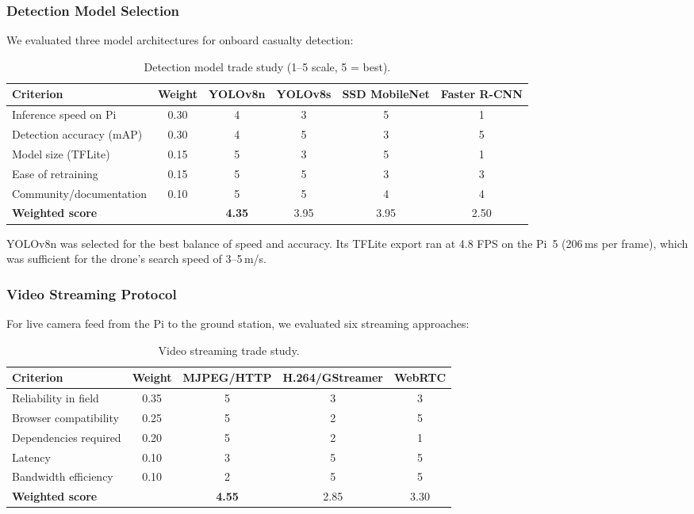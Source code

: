 \subsubsection{Detection Model Selection}

We evaluated three model architectures for onboard casualty detection:

\begin{table}[htbp]
\centering
\compactTable
\caption{Detection model trade study (1--5 scale, 5 = best).}
\label{tab:model_trade}
\begin{tabular}{l c c c c c}
\toprule
\textbf{Criterion} & \textbf{Weight} & \textbf{YOLOv8n} & \textbf{YOLOv8s} & \textbf{SSD MobileNet} & \textbf{Faster R-CNN} \\
\midrule
Inference speed on Pi & 0.30 & 4 & 3 & 5 & 1 \\
Detection accuracy (mAP) & 0.30 & 4 & 5 & 3 & 5 \\
Model size (TFLite) & 0.15 & 5 & 3 & 5 & 1 \\
Ease of retraining & 0.15 & 5 & 5 & 3 & 3 \\
Community/documentation & 0.10 & 5 & 5 & 4 & 4 \\
\midrule
\textbf{Weighted score} & & \textbf{4.35} & 3.95 & 3.95 & 2.50 \\
\bottomrule
\end{tabular}
\end{table}

YOLOv8n was selected for the best balance of speed and accuracy. Its TFLite export ran at 4.8 FPS on the Pi~5 (206\,ms per frame), which was sufficient for the drone's search speed of 3--5\,m/s.

\subsubsection{Video Streaming Protocol}

For live camera feed from the Pi to the ground station, we evaluated six streaming approaches:

\begin{table}[htbp]
\centering
\compactTable
\caption{Video streaming trade study.}
\label{tab:stream_trade}
\begin{tabular}{l c c c c}
\toprule
\textbf{Criterion} & \textbf{Weight} & \textbf{MJPEG/HTTP} & \textbf{H.264/GStreamer} & \textbf{WebRTC} \\
\midrule
Reliability in field & 0.35 & 5 & 3 & 3 \\
Browser compatibility & 0.25 & 5 & 2 & 5 \\
Dependencies required & 0.20 & 5 & 2 & 1 \\
Latency & 0.10 & 3 & 5 & 5 \\
Bandwidth efficiency & 0.10 & 2 & 5 & 5 \\
\midrule
\textbf{Weighted score} & & \textbf{4.55} & 2.85 & 3.30 \\
\bottomrule
\end{tabular}
\end{table}

